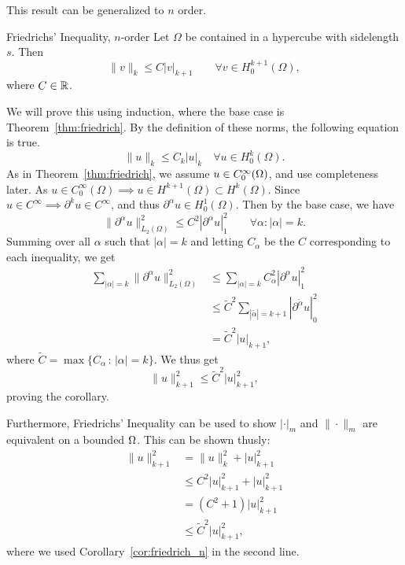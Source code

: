 This result can be generalized to $n$ order. 

\begin{kor}{Friedrichs' Inequality, $n$-order}
    Let $\Omega$ be contained in a hypercube with sidelength $s$. Then 
\begin{equation*}
    \| v \|_{k} \leq C |v|_{k+1} \quad \quad \forall v \in H_0^{k+1}(\Omega),
\end{equation*}
where $C\in \mathbb{R}$.~\label{cor:friedrich_n}
\end{kor}
\begin{bev}
We will prove this using induction, where the base case is Theorem~\ref{thm:friedrich}.
By the definition of these norms, the following equation is true.
\begin{equation*}
    \|u\|_{k } \leq C_k |u|_k \quad \forall u \in H_0^k (\Omega). 
\end{equation*}
As in Theorem~\ref{thm:friedrich}, we assume $u \in C^\infty_0(\Omega)$, and use completeness later.
As $u\in C^{\infty}_0(\Omega)\implies u \in H^{k+1}(\Omega)\subset H^k(\Omega)$. 
Since $u \in C^{\infty} \implies \partial^k u\in C^{\infty}$, 
and thus $\partial^\alpha u \in H^1_0(\Omega)$. Then by the base case, we have
\begin{equation*}
    \|\partial^\alpha u\|^2_{L_2(\Omega)} \leq C^2 |\partial^\alpha u|_1^2 \quad\quad \forall \alpha : |\alpha|=k.
\end{equation*}
Summing over all $\alpha$ such that $|\alpha| = k$ and letting $C_\alpha$ be the $C$ corresponding to each inequality, we get
\begin{equation}
    \begin{split}
        \sum_{|\alpha|=k} \|\partial^\alpha u\|^2_{L_2(\Omega)} &\leq \sum_{|\alpha|=k} C_\alpha^2 |\partial^\alpha u|_1^2 \\
        &\leq  \tilde{C}^2 \sum_{|\tilde{\alpha}|=k+1} |\partial^{\tilde{\alpha}} u |^2_0 \\
        &= \tilde{C}^2 |u|_{k+1},
    \end{split}
\end{equation}  
where $\tilde{C} = \max\{C_\alpha \,:\, |\alpha| = k\}$.
We thus get
\begin{equation}
    \|u\|^2_{k+1} \leq \tilde{C}^2 |u|^2_{k+1},
\end{equation}
proving the corollary.
\end{bev}
Furthermore, Friedrichs' Inequality can be used to show $|\cdot|_m$ and $\| \cdot\|_m$ are equivalent on a bounded 
$\Omega$. 
This can be shown thusly:
\begin{align*}
    \|u\|^2_{k+1} &=\|u\|^2_{k} + |u|^2_{k+1} \\
    &\leq C^2|u|^2_{k+1} + |u|^2_{k+1} \\
    &= (C^2 + 1)|u|^2_{k+1} \\
    &\leq \tilde{C}^2 |u|^2_{k+1},
\end{align*}
where we used Corollary~\ref{cor:friedrich_n} in the second line.